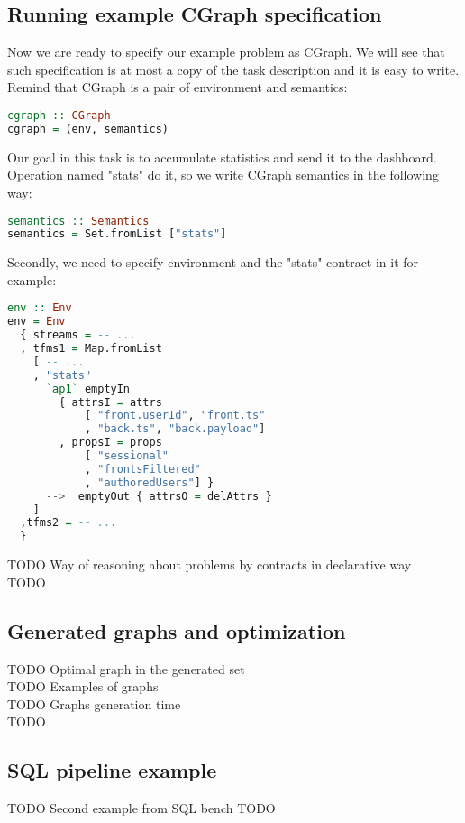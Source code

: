 \label{sec:eval}
\subsection{Running example CGraph specification}

Now we are ready to specify our example problem as CGraph.
We will see that such specification is at most a copy of the task description and it is easy to write.
Remind that CGraph is a pair of environment and semantics:
\begin{lstlisting}[language=Haskell]
cgraph :: CGraph
cgraph = (env, semantics)
\end{lstlisting}

Our goal in this task is to accumulate statistics and send it to the dashboard.
Operation named "stats" do it, so we write CGraph semantics in the following way:
\begin{lstlisting}[language=Haskell]
semantics :: Semantics
semantics = Set.fromList ["stats"]
\end{lstlisting}

Secondly, we need to specify environment and the "stats" contract in it for example:
\begin{lstlisting}[language=Haskell]
env :: Env
env = Env
  { streams = -- ...
  , tfms1 = Map.fromList
    [ -- ...
    , "stats"
      `ap1` emptyIn
        { attrsI = attrs
            [ "front.userId", "front.ts"
            , "back.ts", "back.payload"]
        , propsI = props
            [ "sessional"
            , "frontsFiltered"
            , "authoredUsers"] }
      -->  emptyOut { attrsO = delAttrs }
    ]
  ,tfms2 = -- ...
  }
\end{lstlisting}



TODO Way of reasoning about problems by contracts in declarative way \\
TODO

\subsection{Generated graphs and optimization}

TODO Optimal graph in the generated set \\
TODO Examples of graphs \\
TODO Graphs generation time \\
TODO

\subsection{SQL pipeline example}

TODO Second example from SQL bench
TODO
